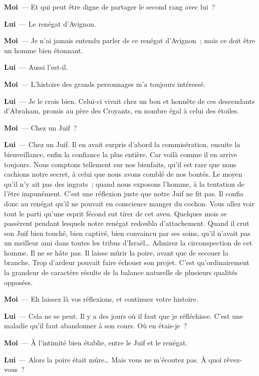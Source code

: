 \documentclass[french,twoside]{book} %
\newcommand{\labelchar}[1]{\textbf{\color{rubric} #1}}
\begin{document}
\labelchar{Moi} — Et qui peut être digne de partager le second rang avec lui ?\par
\labelchar{Lui} — Le renégat d’Avignon.\par
\labelchar{Moi} — Je n’ai jamais entendu parler de ce renégat d’Avignon ; mais ce doit être un homme bien étonnant.\par
\labelchar{Lui} — Aussi l’est-il.\par
\labelchar{Moi} — L’histoire des grands personnages m’a toujours intéressé.\par
\labelchar{Lui} — Je le crois bien. Celui-ci vivait chez un bon et honnête de ces descendants d’Abraham, promis au père des Croyants, en nombre égal à celui des étoiles.\par
\labelchar{Moi} — Chez un Juif ?\par
\labelchar{Lui} — Chez un Juif. Il en avait surpris d’abord la commisération, ensuite la bienveillance, enfin la confiance la plus entière. Car voilà comme il en arrive toujours. Nous comptons tellement sur nos bienfaits, qu’il est rare que nous cachions notre secret, à celui que nous avons comblé de nos bontés. Le moyen qu’il n’y ait pas des ingrats ; quand nous exposons l’homme, à la tentation de l’être impunément. C’est une réflexion juste que notre Juif ne fit pas. Il confia donc au renégat qu’il ne pouvait en conscience manger du cochon. Vous allez voir tout le parti qu’une esprit fécond sut tirer de cet aveu. Quelques mois se passèrent pendant lesquels notre renégat redoubla d’attachement. Quand il crut son Juif bien touché, bien captivé, bien convaincu par ses soins, qu’il n’avait pas un meilleur ami dans toutes les tribus d’Israël… Admirez la circonspection de cet homme. Il ne se hâte pas. Il laisse mûrir la poire, avant que de secouer la branche. Trop d’ardeur pouvait faire échouer son projet. C’est qu’ordinairement la grandeur de caractère résulte de la balance naturelle de plusieurs qualités opposées.\par
\labelchar{Moi} — Eh laissez là vos réflexions, et continuez votre histoire.\par
\labelchar{Lui} — Cela ne se peut. Il y a des jours où il faut que je réfléchisse. C’est une maladie qu’il faut abandonner à son cours. Où en étais-je ?\par
\labelchar{Moi} — À l’intimité bien établie, entre le Juif et le renégat.\par
\labelchar{Lui} — Alors la poire était mûre… Mais vous ne m’écoutez pas. À quoi rêvez-vous ?\par
\end{document}
